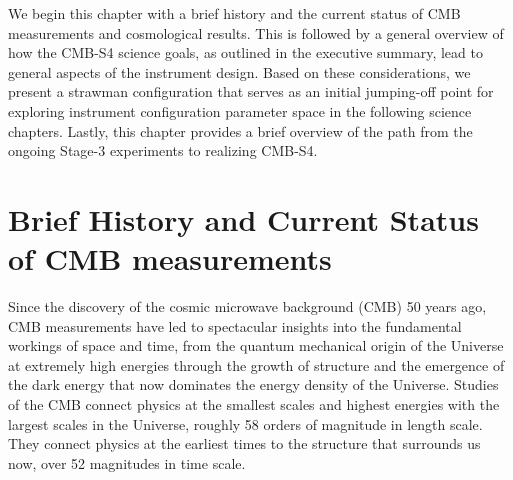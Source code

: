 
%

We begin this chapter with a brief history and the current status of CMB measurements and cosmological results.  This is followed by a general overview of how the CMB-S4 science goals, as outlined in the executive summary, lead to general aspects of the instrument design. Based on these considerations, we present a strawman configuration that serves as an initial jumping-off point for exploring instrument configuration parameter space in the following science chapters.  Lastly, this chapter provides a brief overview of the path from the ongoing Stage-3 experiments to realizing CMB-S4. 

\section{Brief History and Current Status of CMB measurements}
\label{sec:background}

Since the discovery of the cosmic microwave background (CMB) 50 years ago, CMB measurements have led to spectacular insights into the fundamental workings of space and time, from the quantum mechanical origin of the Universe at extremely high energies through the growth of structure and the emergence of the dark energy that now dominates the energy density of the Universe. Studies of the CMB connect physics at the smallest scales and highest energies with the largest scales in the Universe, roughly 58 orders of magnitude in length scale. They connect physics at the earliest times to the structure that surrounds us now, over 52 magnitudes in time scale. 

